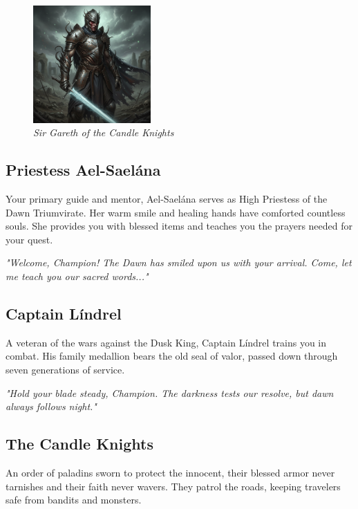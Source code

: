 \documentclass[11pt,a4paper,twoside]{book}
\begin{document}
\begin{figure}
    \centering
    \includegraphics[width=0.4\textwidth]{images/candle_knight_2025-09-03T22-23-00-355Z_1.png}
    \caption*{\small\textit{Sir Gareth of the Candle Knights}}
\end{figure}

\subsection{Priestess Ael-Saelána}

Your primary guide and mentor, Ael-Saelána serves as High Priestess of the Dawn Triumvirate. Her warm smile and healing hands have comforted countless souls. She provides you with blessed items and teaches you the prayers needed for your quest.

\textit{"Welcome, Champion! The Dawn has smiled upon us with your arrival. Come, let me teach you our sacred words..."}

\subsection{Captain Líndrel}

A veteran of the wars against the Dusk King, Captain Líndrel trains you in combat. His family medallion bears the old seal of valor, passed down through seven generations of service.

\textit{"Hold your blade steady, Champion. The darkness tests our resolve, but dawn always follows night."}

\subsection{The Candle Knights}

An order of paladins sworn to protect the innocent, their blessed armor never tarnishes and their faith never wavers. They patrol the roads, keeping travelers safe from bandits and monsters.
\end{document}

